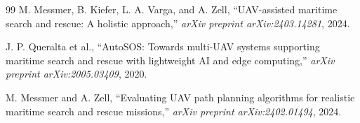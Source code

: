 \documentclass[11pt,a4paper]{article}
\begin{document}
\begin{thebibliography}{99}
M. Messmer, B. Kiefer, L. A. Varga, and A. Zell,
``UAV-assisted maritime search and rescue: A holistic approach,''
\textit{arXiv preprint arXiv:2403.14281}, 2024.

J. P. Queralta et al.,
``AutoSOS: Towards multi-UAV systems supporting maritime search and rescue
with lightweight AI and edge computing,''
\textit{arXiv preprint arXiv:2005.03409}, 2020.

M. Messmer and A. Zell,
``Evaluating UAV path planning algorithms for realistic maritime search
and rescue missions,''
\textit{arXiv preprint arXiv:2402.01494}, 2024.

\end{thebibliography}
\end{document}

